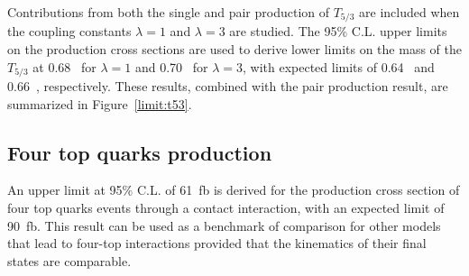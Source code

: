 Contributions from both the single and pair production of $T_{5/3}$ are included when the coupling constants  $\lambda=1$ and $\lambda=3$ are studied.
The 95\% C.L. upper limits on the production cross sections are used to derive lower limits on the mass of the $T_{5/3}$ at 0.68~\TeV{} for $\lambda=1$ and 0.70~\TeV{} for $\lambda=3$, with expected limits of 0.64~\TeV{} and 0.66~\TeV{}, respectively. 
These results, combined with the pair production result, are summarized in Figure~\ref{limit:t53}.



\subsection{Four top quarks production}

An upper limit at 95\% C.L. of 61~fb is derived for the production cross section of four top quarks events through a contact interaction, with an expected limit of 90~fb.
This result can be used as a benchmark of comparison for other models that lead to four-top interactions provided that the kinematics of their final states are comparable.



